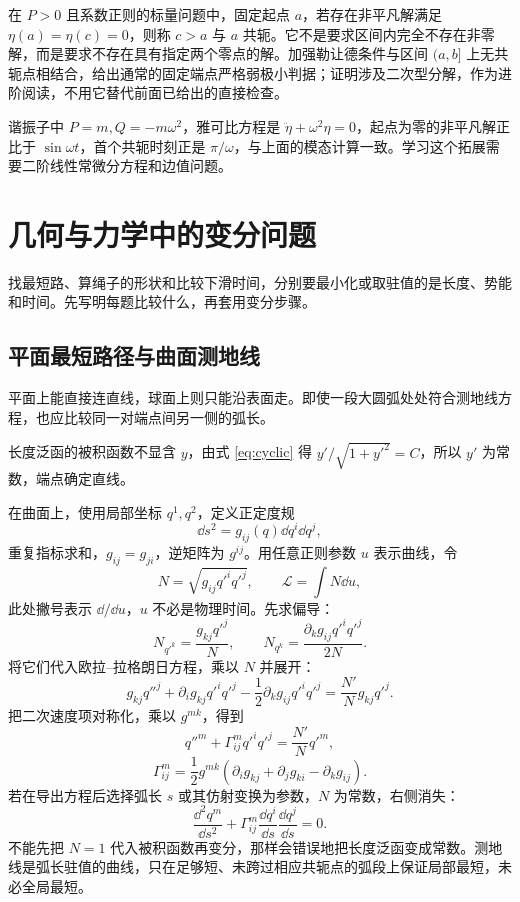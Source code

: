 在 $P>0$ 且系数正则的标量问题中，固定起点 $a$，若存在非平凡解满足 $\eta(a)=\eta(c)=0$，则称 $c>a$ 与 $a$ 共轭。它不是要求区间内完全不存在非零解，而是要求不存在具有指定两个零点的解。加强勒让德条件与区间 $(a,b]$ 上无共轭点相结合，给出通常的固定端点严格弱极小判据；证明涉及二次型分解，作为进阶阅读，不用它替代前面已给出的直接检查。

谐振子中 $P=m,Q=-m\omega^2$，雅可比方程是 $\ddot\eta+\omega^2\eta=0$，起点为零的非平凡解正比于 $\sin\omega t$，首个共轭时刻正是 $\pi/\omega$，与上面的模态计算一致。学习这个拓展需要二阶线性常微分方程和边值问题。

\section{几何与力学中的变分问题}
找最短路、算绳子的形状和比较下滑时间，分别要最小化或取驻值的是长度、势能和时间。先写明每题比较什么，再套用变分步骤。

\subsection{平面最短路径与曲面测地线}
平面上能直接连直线，球面上则只能沿表面走。即使一段大圆弧处处符合测地线方程，也应比较同一对端点间另一侧的弧长。

长度泛函的被积函数不显含 $y$，由式 \eqref{eq:cyclic} 得 $y'/\sqrt{1+y'^2}=C$，所以 $y'$ 为常数，端点确定直线。

在曲面上，使用局部坐标 $q^1,q^2$，定义正定度规
\[
\dd s^2=g_{ij}(q)\dd q^i\dd q^j,
\]
重复指标求和，$g_{ij}=g_{ji}$，逆矩阵为 $g^{ij}$。用任意正则参数 $u$ 表示曲线，令
\[
N=\sqrt{g_{ij}q'^iq'^j},\qquad \mathcal L=\int N\dd u,
\]
此处撇号表示 $\dd/\dd u$，$u$ 不必是物理时间。先求偏导：
\[
N_{q'^k}=\frac{g_{kj}q'^j}{N},\qquad
N_{q^k}=\frac{\partial_kg_{ij}q'^iq'^j}{2N}.
\]
将它们代入欧拉--拉格朗日方程，乘以 $N$ 并展开：
\[
g_{kj}q''^j+\partial_i g_{kj}q'^iq'^j
-\frac12\partial_kg_{ij}q'^iq'^j
=\frac{N'}N g_{kj}q'^j.
\]
把二次速度项对称化，乘以 $g^{mk}$，得到
\[
q''^m+\Gamma^m_{ij}q'^iq'^j=\frac{N'}Nq'^m,
\]
\begin{equation}\label{eq:christoffel}
\Gamma^m_{ij}=\frac12g^{mk}(\partial_i g_{kj}+\partial_j g_{ki}-\partial_k g_{ij}).
\end{equation}
若在导出方程后选择弧长 $s$ 或其仿射变换为参数，$N$ 为常数，右侧消失：
\begin{equation}\label{eq:geodesic}
\boxed{\frac{\dd^2q^m}{\dd s^2}+\Gamma^m_{ij}\frac{\dd q^i}{\dd s}\frac{\dd q^j}{\dd s}=0.}
\end{equation}
不能先把 $N=1$ 代入被积函数再变分，那样会错误地把长度泛函变成常数。测地线是弧长驻值的曲线，只在足够短、未跨过相应共轭点的弧段上保证局部最短，未必全局最短。

